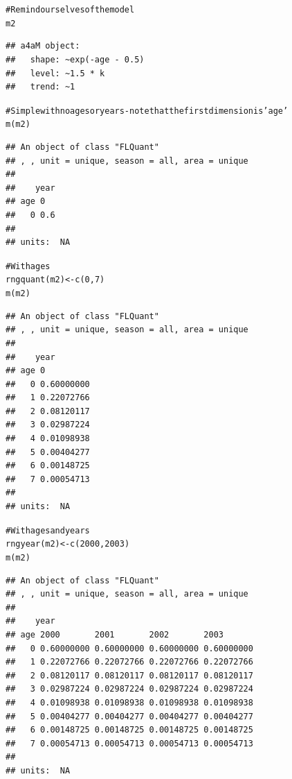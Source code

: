 \documentclass[a4paper,english,10pt]{article}\usepackage[]{graphicx}\usepackage[]{color}
\makeatletter
\newcommand{\hlnum}[1]{\textcolor[rgb]{0.2,0.2,0.2}{#1}}%
\newcommand{\hlcom}[1]{\textcolor[rgb]{0.2,0.267,0.4}{#1}}%
\newcommand{\hlstd}[1]{\textcolor[rgb]{0,0,0}{#1}}%
\newcommand{\hlkwb}[1]{\textcolor[rgb]{0.361,0.506,0.596}{#1}}%
\newcommand{\hlkwd}[1]{\textcolor[rgb]{0.361,0.506,0.596}{#1}}%
\newenvironment{kframe}{%
 \def\at@end@of@kframe{}%
 \ifinner\ifhmode%
  \def\at@end@of@kframe{\end{minipage}}%
  \begin{minipage}{\columnwidth}%
 \fi\fi%
 \def\FrameCommand##1{\hskip\@totalleftmargin \hskip-\fboxsep
 \colorbox{shadecolor}{##1}\hskip-\fboxsep
     \hskip-\linewidth \hskip-\@totalleftmargin \hskip\columnwidth}%
 \MakeFramed {\advance\hsize-\width
   \@totalleftmargin\z@ \linewidth\hsize
   \@setminipage}}%
 {\par\unskip\endMakeFramed%
 \at@end@of@kframe}
\newenvironment{knitrout}{}{} %
\makeatother
\begin{document}
\begin{knitrout}
\color{fgcolor}\begin{kframe}
\begin{alltt}
\hlcom{# Remind ourselves of the model}
\hlstd{m2}
\end{alltt}
\begin{verbatim}
## a4aM object:
##   shape: ~exp(-age - 0.5)
##   level: ~1.5 * k
##   trend: ~1
\end{verbatim}
\begin{alltt}
\hlcom{# Simple with no ages or years - note that the first dimension is 'age'}
\hlkwd{m}\hlstd{(m2)}
\end{alltt}
\begin{verbatim}
## An object of class "FLQuant"
## , , unit = unique, season = all, area = unique
## 
##    year
## age 0  
##   0 0.6
## 
## units:  NA
\end{verbatim}
\begin{alltt}
\hlcom{# With ages}
\hlkwd{rngquant}\hlstd{(m2)} \hlkwb{<-} \hlkwd{c}\hlstd{(}\hlnum{0}\hlstd{,} \hlnum{7}\hlstd{)}
\hlkwd{m}\hlstd{(m2)}
\end{alltt}
\begin{verbatim}
## An object of class "FLQuant"
## , , unit = unique, season = all, area = unique
## 
##    year
## age 0         
##   0 0.60000000
##   1 0.22072766
##   2 0.08120117
##   3 0.02987224
##   4 0.01098938
##   5 0.00404277
##   6 0.00148725
##   7 0.00054713
## 
## units:  NA
\end{verbatim}
\begin{alltt}
\hlcom{# With ages and years}
\hlkwd{rngyear}\hlstd{(m2)} \hlkwb{<-} \hlkwd{c}\hlstd{(}\hlnum{2000}\hlstd{,} \hlnum{2003}\hlstd{)}
\hlkwd{m}\hlstd{(m2)}
\end{alltt}
\begin{verbatim}
## An object of class "FLQuant"
## , , unit = unique, season = all, area = unique
## 
##    year
## age 2000       2001       2002       2003      
##   0 0.60000000 0.60000000 0.60000000 0.60000000
##   1 0.22072766 0.22072766 0.22072766 0.22072766
##   2 0.08120117 0.08120117 0.08120117 0.08120117
##   3 0.02987224 0.02987224 0.02987224 0.02987224
##   4 0.01098938 0.01098938 0.01098938 0.01098938
##   5 0.00404277 0.00404277 0.00404277 0.00404277
##   6 0.00148725 0.00148725 0.00148725 0.00148725
##   7 0.00054713 0.00054713 0.00054713 0.00054713
## 
## units:  NA
\end{verbatim}
\begin{alltt}

\end{alltt}
\end{kframe}
\end{knitrout}
\end{document}
